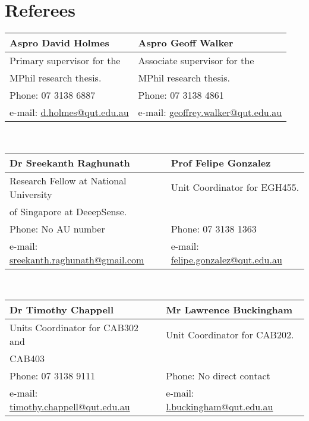 \documentclass[a4paper,12pt]{article}
\begin{document}
{}{
\section{Referees}
\begin{tabular}{ |p{8cm}||p{8cm}| }
	\hline
	\textbf{Aspro David Holmes} & \textbf{Aspro Geoff Walker}  \\ 
	\hline
	Primary supervisor for the & Associate supervisor for the \\  
	MPhil research thesis. & MPhil research thesis.   \\
	\hline
	Phone: 07 3138 6887 & Phone: 07 3138 4861 \\
	\hline
	e-mail: \href{mailto:d.holmes@qut.edu.au}{d.holmes@qut.edu.au} & e-mail: \href{mailto:igeoffrey.walker@qut.edu.au}{geoffrey.walker@qut.edu.au} \\
	\hline
\end{tabular}
\\ [4pc]
\begin{tabular}{ |p{8cm}||p{8cm}| }
	\hline
	\textbf{Dr Sreekanth Raghunath} & \textbf{Prof Felipe Gonzalez }  \\ 
	\hline
	Research Fellow at National University & Unit Coordinator for EGH455. \\  
	of Singapore at DeeepSense. &    \\
	\hline
	Phone: No AU number & Phone: 07 3138 1363 \\
	\hline
	e-mail: \href{mailto:sreekanth.raghunath@gmail.com}{sreekanth.raghunath@gmail.com} & e-mail: \href{mailto:felipe.gonzalez@qut.edu.au}{felipe.gonzalez@qut.edu.au} \\
	\hline
\end{tabular}
\\ [4pc]
\begin{tabular}{ |p{8cm}||p{8cm}| }
	\hline
	\textbf{Dr Timothy Chappell} & \textbf{Mr Lawrence Buckingham }  \\ 
	\hline
	Units Coordinator for CAB302 and & Unit Coordinator for CAB202. \\  
	 CAB403 &    \\
	\hline
	Phone: 07 3138 9111 & Phone: No direct contact \\
	\hline
	e-mail: \href{mailto:timothy.chappell@qut.edu.au}{timothy.chappell@qut.edu.au} & e-mail: \href{mailto:l.buckingham@qut.edu.au}{l.buckingham@qut.edu.au} \\
	\hline
\end{tabular}
\\ [4pc]
\begin{tabular}{ |p{8cm}||p{8cm}| }

\end{tabular}}
\end{document}
